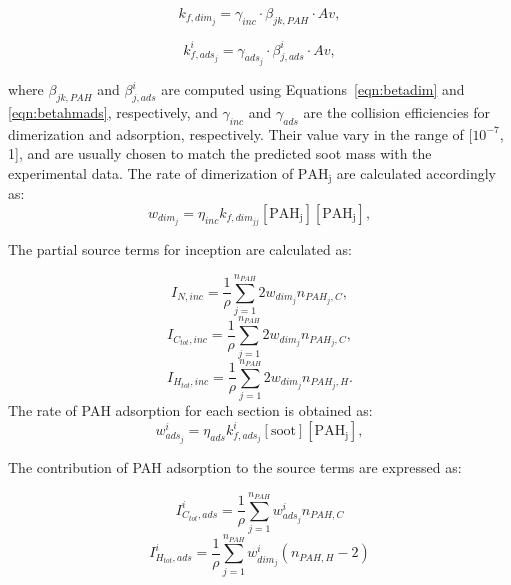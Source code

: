 \begin{equation}
	k_{f,dim_j}=
	\gamma_{inc}\cdot\beta_{jk,PAH}\cdot Av
	\label{eqn:kfdim},
\end{equation}

\begin{equation}
	k^i_{f,ads_j}=
	\gamma_{ads_j}\cdot\beta^i_{j,ads}\cdot Av
	\label{eqn:kfads},
\end{equation}

\noindent where $\beta_{jk,PAH}$ and $\beta^i_{j,ads}$ are computed using Equations~\eqref{eqn:betadim} and \eqref{eqn:betahmads}, respectively, and ${\gamma_{inc}}$ and ${\gamma_{ads}}$ are the collision efficiencies for dimerization and adsorption, respectively. Their value vary in the range of [$\mathrm{10^{-7}}$, 1], and are usually chosen to match the predicted soot mass with the experimental data. The rate of dimerization of $\mathrm{PAH_j}$ are calculated accordingly as:
\begin{equation}
	w_{dim_j} = \eta_{inc} k_{f,dim_{jj}} [\mathrm{PAH_j}] [\mathrm{PAH_j}],
	\label{eqn:irrevdim_wdim}
\end{equation}

The partial source terms for inception are calculated as:

\begin{equation}
	I_{N,inc} =\frac{1}{\rho} \sum_{j=1}^{n_{PAH}} 2w_{dim_j} n_{PAH_j,C},
	\label{eqn:INinc}
\end{equation}
\begin{equation}
	I_{C_{tot},inc} = \frac{1}{\rho}\sum_{j=1}^{n_{PAH}} 2w_{dim_j} n_{PAH_j,C},
	\label{eqn:ICtotinc}
\end{equation}
\begin{equation}
	I_{H_{tot},inc} =\frac{1}{\rho} \sum_{j=1}^{n_{PAH}} 2w_{dim_j} n_{PAH_j,H}.
	\label{eqn:IHtotinc}
\end{equation}
The rate of PAH adsorption for each section is obtained as:
\begin{equation}
	w^i_{ads_j} = \eta_{ads} k^i_{f,ads_{j}} [\mathrm{soot}] [\mathrm{PAH_j}],
	\label{eqn:adsrate_irrevdim}
\end{equation}

The contribution of PAH adsorption to the source terms are expressed as:

\begin{equation}
	I^i_{C_{tot},ads} = \frac{1}{\rho}\sum_{j=1}^{n_{PAH}} w^i_{ads_j} n_{PAH,C}
	\label{eqn:ICtotads}
\end{equation}
\begin{equation}
	I^i_{H_{tot},ads} =\frac{1}{\rho} \sum_{j=1}^{n_{PAH}} w^i_{dim_j} (n_{PAH,H}-2)
	\label{eqn:IHtotads}
\end{equation}

